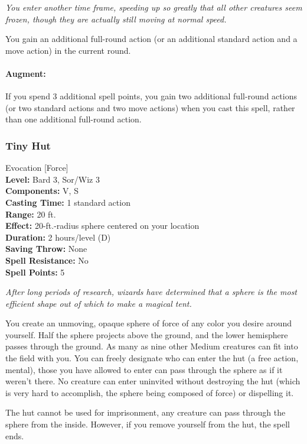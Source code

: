 \emph{You enter another time frame, speeding up so greatly that all other creatures seem frozen, though they are actually still moving at normal speed.}

You gain an additional full-round action (or an additional standard action and a move action) in the current round. 

\paragraph{Augment:} If you spend 3 additional spell points, you gain two additional full-round actions (or two standard actions and two move actions) when you cast this spell,
rather than one additional full-round action.
\subsubsection{Tiny Hut}
\label{Spell:TinyHut}
Evocation [Force]
\\ \textbf{Level:} Bard 3, Sor/Wiz 3
\\ \textbf{Components:} V, S
\\ \textbf{Casting Time:} 1 standard action
\\ \textbf{Range:} 20 ft.
\\ \textbf{Effect:} 20-ft.-radius sphere centered on your location
\\ \textbf{Duration:} 2 hours/level (D)
\\ \textbf{Saving Throw:} None
\\ \textbf{Spell Resistance:} No
\\ \textbf{Spell Points:} 5

\emph{After long periods of research, wizards have determined that a sphere is the most efficient shape out of which to make a magical tent.}

You create an unmoving, opaque sphere of force of any color you desire around yourself. 
Half the sphere projects above the ground, and the lower hemisphere passes through the ground. 
As many as nine other Medium creatures can fit into the field with you. 
You can freely designate who can enter the hut (a free action, mental), those you have allowed to enter can pass through
the sphere as if it weren't there.
No creature can enter uninvited without destroying the hut (which is very hard to accomplish, the sphere being composed of force)
or dispelling it.

The hut cannot be used for imprisonment, any creature can pass through the sphere from the inside. 
However, if you remove yourself from the hut, the spell ends.

